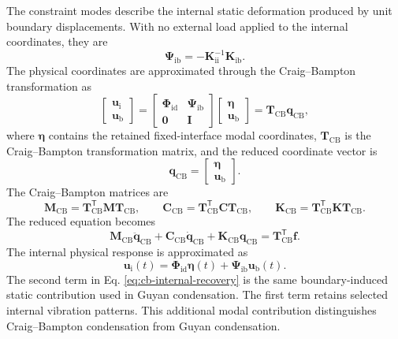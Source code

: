 \documentclass[11pt,a4paper]{article}
\numberwithin{equation}{section}
\begin{document}
The constraint modes describe the internal static deformation produced by unit boundary displacements. With no external load applied to the internal coordinates, they are
\begin{equation}
	\bm{\Psi}_{\mathrm{ib}}=-\mathbf{K}_{\mathrm{ii}}^{-1}\mathbf{K}_{\mathrm{ib}}.
	\label{eq:constraint-modes}
\end{equation}
The physical coordinates are approximated through the Craig--Bampton transformation as
\begin{equation}
	\begin{bmatrix}
		\bm{u}_{\mathrm{i}}\\
		\bm{u}_{\mathrm{b}}
	\end{bmatrix}
	=
	\begin{bmatrix}
		\bm{\Phi}_{\mathrm{id}} & \bm{\Psi}_{\mathrm{ib}}\\
		\mathbf{0} & \mathbf{I}
	\end{bmatrix}
	\begin{bmatrix}
		\bm{\eta}\\
		\bm{u}_{\mathrm{b}}
	\end{bmatrix}
	=
	\mathbf{T}_{\mathrm{CB}}\bm{q}_{\mathrm{CB}},
	\label{eq:cb-transformation}
\end{equation}
where \(\bm{\eta}\) contains the retained fixed-interface modal coordinates, \(\mathbf{T}_{\mathrm{CB}}\) is the Craig--Bampton transformation matrix, and the reduced coordinate vector is
\begin{equation}
	\bm{q}_{\mathrm{CB}}=
	\begin{bmatrix}
		\bm{\eta}\\
		\bm{u}_{\mathrm{b}}
	\end{bmatrix}.
	\label{eq:cb-reduced-coordinate}
\end{equation}
The Craig--Bampton matrices are
\begin{equation}
	\mathbf{M}_{\mathrm{CB}}=\mathbf{T}_{\mathrm{CB}}^{\mathsf{T}}\mathbf{M}\mathbf{T}_{\mathrm{CB}},
	\qquad
	\mathbf{C}_{\mathrm{CB}}=\mathbf{T}_{\mathrm{CB}}^{\mathsf{T}}\mathbf{C}\mathbf{T}_{\mathrm{CB}},
	\qquad
	\mathbf{K}_{\mathrm{CB}}=\mathbf{T}_{\mathrm{CB}}^{\mathsf{T}}\mathbf{K}\mathbf{T}_{\mathrm{CB}}.
	\label{eq:cb-reduced-matrices}
\end{equation}
The reduced equation becomes
\begin{equation}
	\mathbf{M}_{\mathrm{CB}}\ddot{\bm{q}}_{\mathrm{CB}}
	+\mathbf{C}_{\mathrm{CB}}\dot{\bm{q}}_{\mathrm{CB}}
	+\mathbf{K}_{\mathrm{CB}}\bm{q}_{\mathrm{CB}}
	=\mathbf{T}_{\mathrm{CB}}^{\mathsf{T}}\bm{f}.
	\label{eq:cb-reduced-eom}
\end{equation}
The internal physical response is approximated as
\begin{equation}
	\bm{u}_{\mathrm{i}}(t)=
	\bm{\Phi}_{\mathrm{id}}\bm{\eta}(t)
	+\bm{\Psi}_{\mathrm{ib}}\bm{u}_{\mathrm{b}}(t).
	\label{eq:cb-internal-recovery}
\end{equation}
The second term in Eq. \eqref{eq:cb-internal-recovery} is the same boundary-induced static contribution used in Guyan condensation. The first term retains selected internal vibration patterns. This additional modal contribution distinguishes Craig--Bampton condensation from Guyan condensation.
\end{document}
